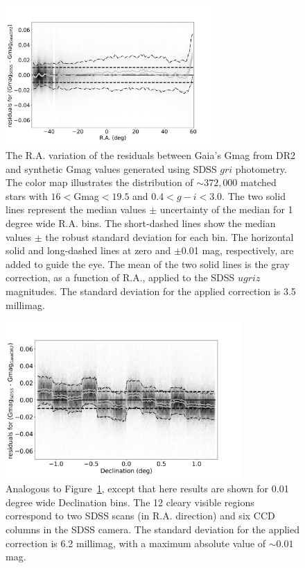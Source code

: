 \begin{figure}
  \centering\includegraphics[width=8cm]{figures/GmagCorrection_RA_Hess.png} 
\caption{The R.A. variation of the residuals between Gaia's Gmag from DR2
and synthetic Gmag values generated using SDSS $gri$ photometry. The 
color map illustrates the distribution of $\sim 372,000$ matched stars with 
$16<$Gmag$<19.5$ and $0.4 < g-i < 3.0$. The two solid lines represent the 
median values $\pm$ uncertainty of the median for 1 degree wide R.A. bins. 
The short-dashed lines show the median values $\pm$ the robust standard 
deviation for each bin. The horizontal solid and long-dashed lines at zero and 
$\pm$0.01 mag, respectively, are added to guide the eye. The mean of the two 
solid lines is the gray correction, as a function of R.A., applied to the SDSS 
$ugriz$ magnitudes. The standard deviation for the applied correction is 3.5 millimag.}
\label{fig:graycorrRA}
\end{figure}

\begin{figure}
    \centering\includegraphics[width=9cm]{figures/GmagCorrection_Dec_Hess.png} 
\caption{Analogous to Figure~\ref{fig:graycorrRA}, except that here results are shown for
0.01 degree wide Declination bins. The 12 cleary visible regions correspond to
two SDSS scans (in R.A. direction) and six CCD columns in the SDSS camera. 
The standard deviation for the applied correction is 6.2 millimag, with a maximum
absolute value of $\sim0.01$ mag.}
\label{fig:graycorrDec}
\end{figure}



